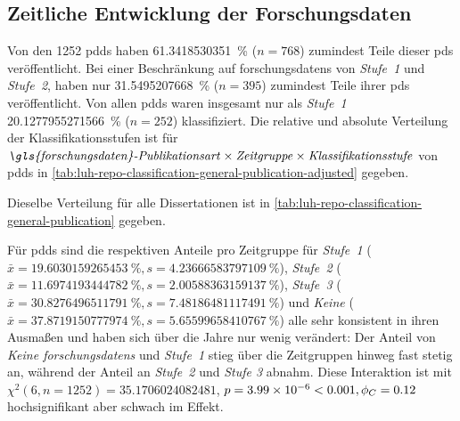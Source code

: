 \subsection{Zeitliche Entwicklung der Forschungsdaten}\label{sec:luh-repo-results-time}
Von den \num{1252} \glspl{pdd} haben \SI[round-mode=places,round-precision=2]{61.3418530351}{\percent} ($n=\num{768}$) zumindest Teile dieser \glspl{pd} veröffentlicht.
Bei einer Beschränkung auf \glspl{forschungsdaten} von \textit{Stufe~1} und \textit{Stufe~2}, haben nur \SI[round-mode=places,round-precision=2]{31.5495207668}{\percent} ($n=\num{395}$) zumindest Teile ihrer \glspl{pd} veröffentlicht.
Von allen \glspl{pdd} waren insgesamt nur als \textit{Stufe~1} \SI[round-mode=places,round-precision=2]{20.1277955271566}{\percent} ($n=252$) klassifiziert.
Die relative und absolute Verteilung der Klassifikationsstufen ist für $\text{\textit{\gls{forschungsdaten}-Publikationsart}}\times\text{\textit{Zeitgruppe}}\times\text{\textit{Klassifikationsstufe}}$ von \glspl{pdd} in \cref{tab:luh-repo-classification-general-publication-adjusted} gegeben.
\begin{table}[!htbp]
	\caption{\gls{forschungsdaten}-Klassifizierung der \glspl{pdd} aus der Stichprobe nach $\text{\textit{Publikationsart}}\times\text{\textit{Klassifikationsstufe}}\times\text{\textit{Jahresgruppe}}$ aufgegliedert.
    Angaben relativ zu der Gesamtanzahl der Jahresgruppe.
    Absolute Werte in Klammern angegeben.}
    
    \label{tab:luh-repo-classification-general-publication-adjusted}
\end{table}
Dieselbe Verteilung für alle Dissertationen ist in \cref{tab:luh-repo-classification-general-publication} gegeben.

Für \glspl{pdd} sind die respektiven Anteile pro Zeitgruppe für \textit{Stufe~1} ($\bar{x}=\SI[round-mode=places,round-precision=2]{19.6030159265453}{\percent},s=\SI[round-mode=places,round-precision=2]{4.23666583797109}{\percent}$), \textit{Stufe~2} ($\bar{x}=\SI[round-mode=places,round-precision=2]{11.6974193444782}{\percent},s=\SI[round-mode=places,round-precision=2]{2.00588363159137}{\percent}$), \textit{Stufe~3} ($\bar{x}=\SI[round-mode=places,round-precision=2]{30.8276496511791}{\percent},s=\SI[round-mode=places,round-precision=2]{7.48186481117491}{\percent}$) und \textit{Keine} ($\bar{x}=\SI[round-mode=places,round-precision=2]{37.8719150777974}{\percent},s=\SI[round-mode=places,round-precision=2]{5.65599658410767}{\percent}$) alle sehr konsistent in ihren Ausmaßen und haben sich über die Jahre nur wenig verändert:
Der Anteil von \textit{Keine \glspl{forschungsdaten}} und \textit{Stufe~1} stieg über die Zeitgruppen hinweg fast stetig an, während der Anteil an \textit{Stufe~2} und \textit{Stufe 3} abnahm.
Diese Interaktion ist mit $\chi^2 (\num{6}, n=\num{1252}) = \num[round-mode=places,round-precision=2]{35.1706024082481}$, $p = \num[round-mode=places,round-precision=2]{3.99360804013405E-06}<\num{0.001},\phi_C=\num[round-mode=places,round-precision=2]{0.118514841833938}$ hochsignifikant aber schwach im Effekt.

